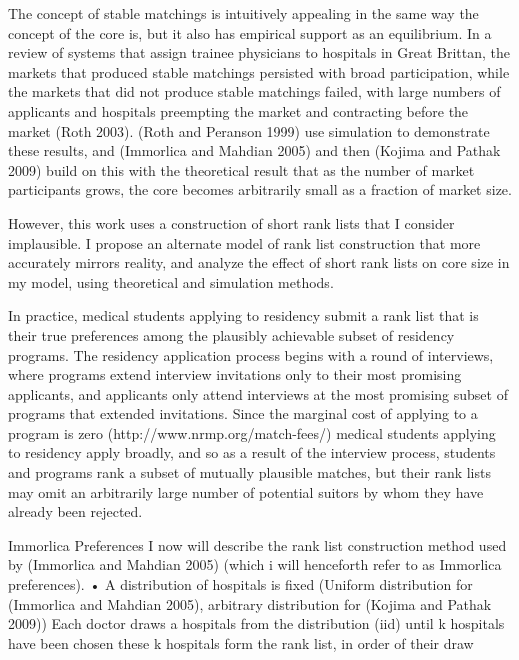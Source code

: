 \documentclass[WP]{AEA}
\begin{document}
The concept of stable matchings is intuitively appealing in the same way the concept of the core is, but it also has empirical support as an equilibrium. In a review of systems that assign trainee physicians to hospitals in Great Brittan, the markets that produced stable matchings persisted with broad participation, while the markets that did not produce stable matchings failed, with large numbers of applicants and hospitals preempting the market and contracting before the market (Roth 2003).
(Roth and Peranson 1999) use simulation to demonstrate these results, and (Immorlica and Mahdian 2005) and then (Kojima and Pathak 2009) build on this with the theoretical result that as the number of market participants grows, the core becomes arbitrarily small as a fraction of market size.  

However, this work uses a construction of short rank lists that I consider implausible.  I propose an alternate model of rank list construction that more accurately mirrors reality, and analyze the effect of short rank lists on core size in my model, using theoretical and simulation methods.

In practice, medical students applying to residency submit a rank list that is their true preferences among the plausibly achievable subset of residency programs. The residency application process begins with a round of interviews, where programs extend interview invitations only to their most promising applicants, and applicants only attend interviews at the most promising subset of programs that extended invitations. Since the marginal cost of applying to a program is zero (http://www.nrmp.org/match-fees/) medical students applying to residency apply broadly, and so as a result of the interview process, students and programs rank a subset of mutually plausible matches, but their rank lists may omit an arbitrarily large number of potential suitors by whom they have already been rejected.


Immorlica Preferences
I now will describe the rank list construction method used by (Immorlica and Mahdian 2005) (which i will henceforth refer to as Immorlica preferences). 
•	A distribution of hospitals is fixed (Uniform distribution for (Immorlica and Mahdian 2005), arbitrary distribution for (Kojima and Pathak 2009))
Each doctor draws a hospitals from the distribution (iid) until k hospitals have been chosen
these k hospitals form the rank list, in order of their draw
\end{document}
